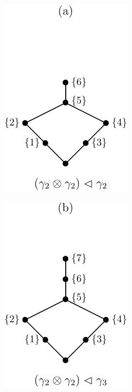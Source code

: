 \documentclass[12pt]{article}
\theoremstyle{definition}
\theoremstyle{remark}
\begin{document}
\begin{center}
\begin{minipage}[c]{0.3\textwidth}
\centering
\includegraphics[scale=0.9]{fri_aa.pdf}
\end{minipage}
\begin{minipage}[c]{0.3\textwidth}
\centering
\includegraphics[scale=0.9]{fri_b.pdf}
\end{minipage}
\begin{minipage}[c]{0.3\textwidth}
\centering

\end{minipage}
\end{center}
\end{document}
